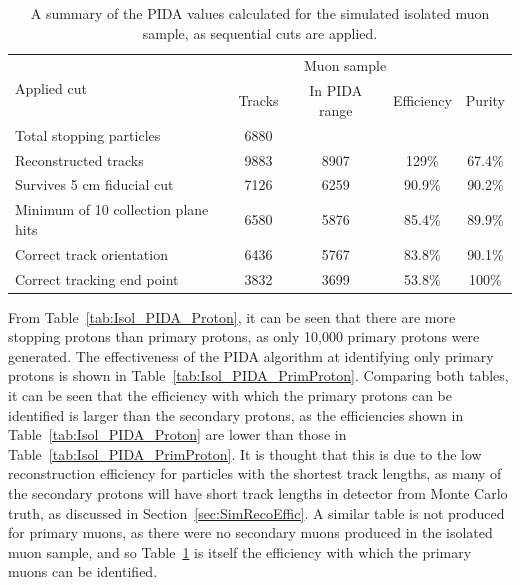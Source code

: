 \begin{table}
  \caption[A summary of the PIDA values calculated for the simulated isolated muon sample, as sequential cuts are applied]
          {A summary of the PIDA values calculated for the simulated isolated muon sample, as sequential cuts are applied.}
  \centering
  \label{tab:Isol_PIDA_Muon}
  \begin{tabular}{l c c c c}
    \toprule
    \multirow{2}{*}{Applied cut} & \multicolumn{3}{c}{Muon sample} \\ 
    \cmidrule{2-5}
      & Tracks & In PIDA range & Efficiency & Purity \\ 
    \midrule
      Total stopping particles            & 6880 &      &        & \\

      Reconstructed tracks                & 9883 & 8907 & 129\%  & 67.4\% \\

      Survives 5 cm fiducial cut          & 7126 & 6259 & 90.9\% & 90.2\% \\

      Minimum of 10 collection plane hits & 6580 & 5876 & 85.4\% & 89.9\% \\

      Correct track orientation           & 6436 & 5767 & 83.8\% & 90.1\% \\

      Correct tracking end point          & 3832 & 3699 & 53.8\% & 100\%  \\
    \bottomrule
  \end{tabular}
\end{table}

From Table~\ref{tab:Isol_PIDA_Proton}, it can be seen that there are more stopping protons than primary protons, as only 10,000 primary protons were generated. The effectiveness of the PIDA algorithm at identifying only primary protons is shown in Table~\ref{tab:Isol_PIDA_PrimProton}. Comparing both tables, it can be seen that the efficiency with which the primary protons can be identified is larger than the secondary protons, as the efficiencies shown in Table~\ref{tab:Isol_PIDA_Proton} are lower than those in Table~\ref{tab:Isol_PIDA_PrimProton}. It is thought that this is due to the low reconstruction efficiency for particles with the shortest track lengths, as many of the secondary protons will have short track lengths in detector from Monte Carlo truth, as discussed in Section~\ref{sec:SimRecoEffic}. A similar table is not produced for primary muons, as there were no secondary muons produced in the isolated muon sample, and so Table~\ref{tab:Isol_PIDA_Muon} is itself the efficiency with which the primary muons can be identified. \\ 

